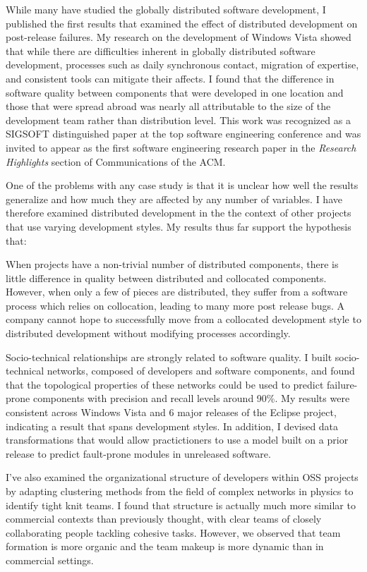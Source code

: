 \documentclass[10pt]{article}
\begin{document}
\begin{small}
While many have studied the globally distributed software development, I
published the first results that examined the effect of distributed development
on post-release failures.  My research on the development of Windows Vista
showed that while there are difficulties inherent in globally distributed
software development, processes such as daily synchronous contact, migration of
expertise, and consistent tools can mitigate their affects.  I found that the
difference in software quality between components that were developed in one
location and those that were spread abroad was nearly all attributable to the
size of the development team rather than distribution level.  This work was
recognized as a SIGSOFT distinguished paper at the top software engineering
conference and was invited to appear as the first software engineering research
paper in the \emph{Research Highlights} section of Communications of the ACM.

One of the problems with any case study is that it is unclear how well the
results generalize and how much they are affected by any number of variables.
I have therefore examined distributed development in the the context of other
projects that use varying development styles.  My results thus far support
the hypothesis that:

When projects have a non-trivial number of distributed components, there is
little difference in quality between distributed and collocated components.
However, when only a few of pieces are distributed, they suffer from a software
process which relies on collocation, leading to many more post release bugs.  A
company cannot hope to successfully move from a collocated development style to
distributed development without modifying processes accordingly.

Socio-technical relationships are strongly related to software quality.  I
built socio-technical networks, composed of developers and software components,
and found that the topological properties of these networks could be used to
predict failure-prone components with precision and recall levels around 90\%.
My results were consistent across Windows Vista and 6 major releases of the
Eclipse project, indicating a result that spans development styles.  In
addition, I devised data transformations that would allow practictioners to use
a model built on a prior release to predict fault-prone modules in unreleased
software.

I've also examined the organizational structure of developers within OSS
projects by adapting clustering methods from the field of complex networks in
physics to identify tight knit teams.  I found that structure is actually much
more similar to commercial contexts than previously thought, with clear teams
of closely collaborating people tackling cohesive tasks. However, we observed
that team formation is more organic and the team makeup is more dynamic than in
commercial settings.


\end{small}
\end{document}
